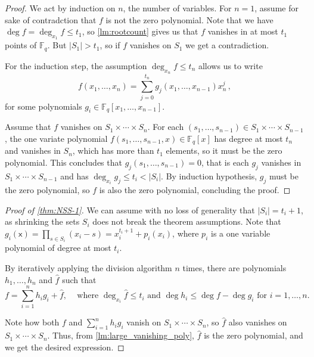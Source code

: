 \documentclass[12pt]{amsart}
\theoremstyle{definition}
\newcommand{\F}{\mathbb{F}}
\newcommand{\vx}{\mathsf{x}}
\begin{document}
\begin{proof}
We act by induction on $n$, the number of variables.
For $n = 1$, assume for sake of contradction that $f$ is not the zero polynomial.
Note that we have $\deg f = \deg_{x_1} f \leq t_1$, so \cref{lm:rootcount} gives us that $f$ vanishes in at most $t_1 $ points of $\F_q$.
But $|S_1| > t_1$, so if $f$ vanishes on $S_1$ we get a contradiction.

For the induction step, the assumption $\deg_{x_n} f \leq t_n$ allows us to write
$$f(x_1, \ldots, x_n) = \sum_{j=0}^{t_n} g_j(x_1, \ldots, x_{n-1}) x_n^j \, ,$$
for some polynomials $g_i \in \F_q[x_1, \ldots, x_{n-1}]$.

Assume that $f$ vanishes on $S_1\times \cdots \times S_n$.
For each $(s_1, \ldots, s_{n-1}) \in S_1\times \cdots \times S_{n-1}$, the one variate polynomial $f(s_1, \ldots, s_{n-1}, x) \in\F_q[x]$ has degree at most $t_n$ and vanishes in $S_n$, which has more than $t_1$ elements, so it must be the zero polynomial.
This concludes that $g_j(s_1, \ldots, s_{n-1}) = 0$, that is each $g_j$ vanishes in $S_1\times \cdots \times S_{n-1}$ and has $\deg_{x_i} g_j \leq t_i < |S_i|$.
By induction hypothesis, $g_j$ must be the zero polynomial, so $f $ is also the zero polynomial, concluding the proof.
\end{proof}


\begin{proof}[Proof of \cref{thm:NSS-1}]
We can assume with no loss of generality that $|S_i| = t_i + 1$, as shrinking the sets $S_i$ does not break the theorem assumptions.
Note that $g_i(\vx) = \prod_{s\in S_i} (x_i - s) = x_i^{t_i + 1} + p_i(x_i)$, where $p_i$ is a one variable polynomial of degree at most $t_i$.

By iteratively applying the division algorithm $n$ times, there are polynomials $h_1, \ldots, h_n$ and $\hat{f}$ such that 
$$f = \sum_{i=1}^n h_i g_i + \hat{f}, \, \, \, \, \, \text{ where $\deg_{x_i}\hat{f} \leq t_i$ and $\deg h_i \leq \deg f - \deg g_i$ for $i=1, \ldots, n$.} $$

Note how both $f$ and $ \sum_{i=1}^n h_i g_i $ vanish on $S_1\times \cdots \times S_n$, so $\hat{f}$ also vanishes on $S_1\times \cdots \times S_n$.
Thus, from \cref{lm:large_vanishing_poly}, $\hat{f}$ is the zero polynomial, and we get the desired expression.
\end{proof}
\end{document}
